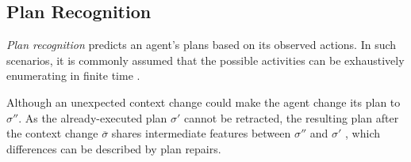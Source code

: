 
\subsection{Plan Recognition}
\textit{Plan recognition} predicts an agent's plans based on its observed actions. In such scenarios, it is commonly assumed that the possible activities can be exhaustively enumerating in finite time \cite{RamirezG09}. 

Although 
an unexpected context change could make the agent change its plan to $\sigma''$. As the already-executed plan $\sigma'$ cannot be retracted, the resulting plan after the context change $\overline{\sigma}$ shares intermediate features between $\sigma''$ and $\sigma'$ \cite{FoxGLS06}, which differences can be described by plan repairs.
